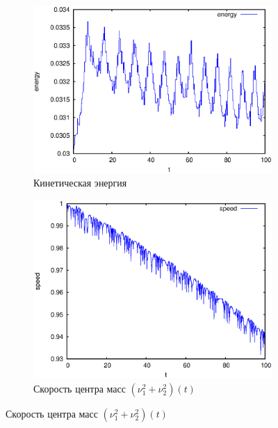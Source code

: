 \begin{figure}
    \centering
    \begin{subfigure}[t]{0.45\textwidth}
        \centering
        \includegraphics[width=\linewidth]{pic/rol__wrench__kinetic_energy}
        \caption{Кинетическая энергия}
        \label{fig:rol__wrench__kinetic_energy}
    \end{subfigure}
    \begin{subfigure}[t]{0.45\textwidth}
        \centering
        \includegraphics[width=\linewidth]{pic/rol__wrench__speed_of_center_of_mass}
        \caption{Скорость центра масс $\left(\nu_1^2 + \nu_2^2\right)(t)$}
        \label{fig:rol__wrench__speed_of_center_of_mass}
    \end{subfigure}
    \vspace{12pt}
    

\end{figure}
